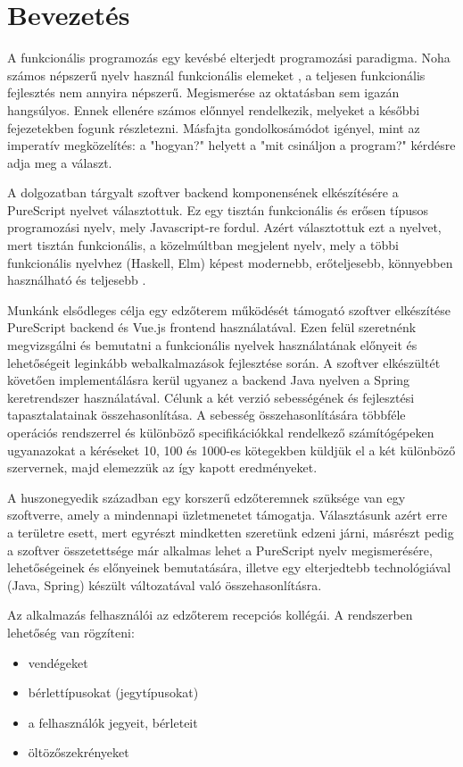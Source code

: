 \documentclass[12pt]{article}
\begin{document}
\section*{Bevezetés}

A funkcionális programozás egy kevésbé elterjedt programozási paradigma. Noha számos népszerű nyelv használ funkcionális elemeket \cite{Java} \cite{py} \cite{cpp},  a teljesen funkcionális fejlesztés nem annyira népszerű. Megismerése az oktatásban sem igazán hangsúlyos. Ennek ellenére számos előnnyel rendelkezik, melyeket a későbbi fejezetekben fogunk részletezni. Másfajta gondolkosámódot igényel, mint az imperatív megközelítés: a "hogyan?" helyett a "mit csináljon a program?" kérdésre adja meg a választ.

A dolgozatban tárgyalt szoftver backend komponensének elkészítésére a PureScript nyelvet választottuk. Ez egy tisztán funkcionális és erősen típusos programozási nyelv, mely Javascript-re fordul. Azért választottuk ezt a nyelvet, mert tisztán funkcionális, a közelmúltban megjelent nyelv, mely a többi funkcionális nyelvhez (Haskell, Elm) képest modernebb, erőteljesebb, könnyebben használható és teljesebb \cite{CS}.

Munkánk elsődleges célja egy edzőterem működését támogató szoftver elkészítése PureScript backend és Vue.js frontend használatával. Ezen felül szeretnénk megvizsgálni és bemutatni a funkcionális nyelvek használatának előnyeit és lehetőségeit leginkább webalkalmazások fejlesztése során. A szoftver elkészültét követően implementálásra kerül ugyanez a backend Java nyelven a Spring keretrendszer használatával. Célunk a két verzió sebességének és fejlesztési tapasztalatainak összehasonlítása. A sebesség összehasonlítására többféle operációs rendszerrel és különböző specifikációkkal rendelkező számítógépeken ugyanazokat a kéréseket 10,  100 és 1000-es kötegekben küldjük el a két különböző szervernek, majd elemezzük az így kapott eredményeket.

A huszonegyedik században egy korszerű edzőteremnek szüksége van egy szoftverre, amely a mindennapi üzletmenetet támogatja. Választásunk azért erre a területre esett, mert egyrészt mindketten szeretünk edzeni járni, másrészt pedig a szoftver összetettsége már alkalmas lehet a PureScript nyelv megismerésére, lehetőségeinek és előnyeinek bemutatására, illetve egy elterjedtebb technológiával (Java, Spring) készült változatával való összehasonlításra.

Az alkalmazás felhasználói az edzőterem recepciós kollégái. A rendszerben lehetőség van rögzíteni:
\begin{itemize}
\item vendégeket
\item bérlettípusokat (jegytípusokat)
\item a felhasználók jegyeit, bérleteit
\item öltözőszekrényeket
\end{itemize}
\end{document}
